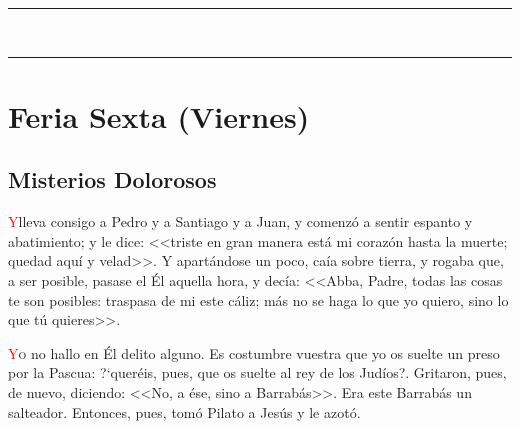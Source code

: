\documentclass[10pt,twoside]{book}
\begin{document}


\iralfinal

\vspace{0.5em}

\begin{center}
      \begin{spacing}{0.25}
            {\rule{20em}{0.4pt}}\\
            {\rule{20em}{0.4pt}}
      \end{spacing}
\end{center}


\section*{\centering Feria Sexta (Viernes)}

\noindent\subsection*{Misterios Dolorosos}

\vspace{1.5em}

\noindent{}
\lettrine[lines=2]{\textcolor{red}{Y}}\space lleva consigo a Pedro y a Santiago y a Juan, y comenzó a sentir espanto y abatimiento; y le dice: <<triste en gran manera está mi corazón hasta la muerte;
quedad aquí y velad>>. Y apartándose un poco, caía sobre tierra, y rogaba que, a ser posible, pasase el Él aquella hora, y decía: <<Abba, Padre, todas las cosas te son posibles:
traspasa de mi este cáliz; más no se haga lo que yo quiero, sino lo que tú quieres>>.

\vspace{0.5em}



\vspace{1.5em}

\noindent{}
\lettrine[lines=2, ante=\guillemotleft]{\textcolor{red}{Y}}o no hallo en Él delito alguno. Es costumbre vuestra que yo os suelte un preso por la Pascua: {?`}queréis, 
pues, que os suelte al rey de los Judíos?\guillemotright. Gritaron, pues, de nuevo, diciendo: <<No, a ése, sino a Barrabás>>. 
Era este Barrabás un salteador. Entonces, pues, tomó Pilato a Jesús y le azotó.
\end{document}
